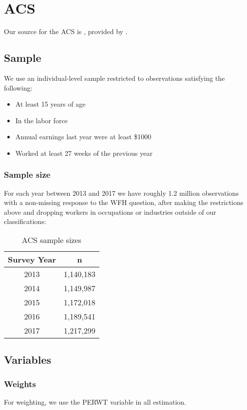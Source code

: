 \documentclass{article}
\begin{document}
\section{ACS}
Our source for the ACS is \cite{ACS}, provided by \cite{IPUMS}.

\subsection{Sample}
We use an individual-level sample restricted to observations satisfying the following:
\begin{itemize}
\item At least 15 years of age
\item In the labor force
\item Annual earnings last year were at least \$1000
\item Worked at least 27 weeks of the previous year
\end{itemize}

\subsubsection{Sample size}
For each year between 2013 and 2017 we have roughly 1.2 million observations with a non-missing response to the WFH question, after making the restrictions above and dropping workers in occupations or industries outside of our classifications:

\begin{table}[ht]
\caption{ACS sample sizes}
\centering
\begin{tabular}{c | c}
\hline%
Survey Year & n \\
\hline %
2013 & 1,140,183  \\ %
2014 & 1,149,987 \\
2015 & 1,172,018 \\
2016 & 1,189,541 \\
2017 & 1,217,299 \\ [1ex] %
\end{tabular}
\label{table:ACS sample size} %
\end{table}

\subsection{Variables}
\subsubsection{Weights}
For weighting, we use the PERWT variable in all estimation.
\end{document}
